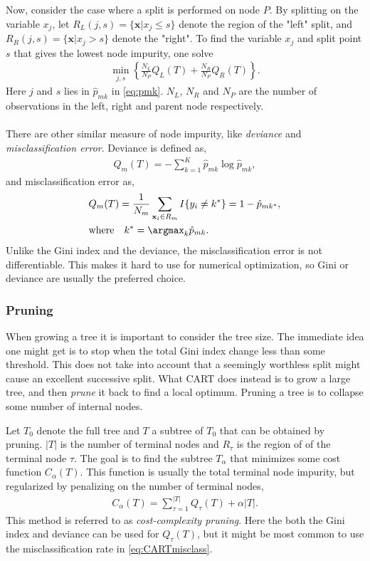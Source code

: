 Now, consider the case where a split is performed on node $P$. By splitting on the variable $x_j$, let $R_L(j,s) = \{\mathbf{x} | x_j \leq s\}$ denote the region of the "left" split,  and $R_R(j,s) = \{\mathbf{x} | x_j > s\}$ denote the "right". To find the variable $x_j$ and split point $s$ that gives the lowest node impurity, one solve
\begin{align}
  \min_{j,s} \left\{ \frac{N_L}{N_P} Q_L(T)
  + \frac{N_R}{N_P} Q_R(T) \right\}.
\end{align}
Here $j$ and $s$ lies in $\hat{p}_{mk}$ in \eqref{eq:pmk}. $N_L$, $N_R$ and $N_P$ are the number of observations in the left, right and parent node respectively.
\\
\\
There are other similar measure of node impurity, like \textit{deviance} and \textit{misclassification error}. Deviance is defined as,
\begin{align}
  Q_m(T) = -  \sum^{K}_{k=1} \hat p_{m k} \log \hat p_{m k},
\end{align}
and misclassification error as,
\begin{align}
  \label{eq:CARTmisclass} 
  &Q_m(T) = \frac{1}{N_m} \sum_{\mathbf{x}_i \in R_m} I\{y_i \neq k^*\} = 1 - \hat p_{m k^*},\\
  &\text{where} \quad k^* = \argmax_k \hat p_{m k}. \notag
\end{align}
Unlike the Gini index and the deviance, the misclassification error is not differentiable. This makes it hard to use for numerical optimization, so Gini or deviance are usually the preferred choice. 

\subsubsection{Pruning}
\label{sub:Pruning}

When growing a tree it is important to consider the tree size. The immediate idea one might get is to stop when the total Gini index change less than some threshold. This does not take into account that a seemingly worthless split might cause an excellent successive split. 
What CART does instead is to grow a large tree, and then \textit{prune} it back to find a local optimum. Pruning a tree is to collapse some number of internal nodes. 

Let $T_0$ denote the full tree and $T$ a subtree of $T_0$ that can be obtained by pruning. $|T|$ is the number of terminal nodes and $R_{\tau}$ is the region of of the terminal node $\tau$. The goal is to find the subtree $T_\alpha$ that minimizes some cost function $C_\alpha (T)$. This function is usually the total terminal node impurity, but regularized by penalizing on the number of terminal nodes,
\begin{align}
  \label{eq:CostPruning} 
  C_\alpha (T) = \sum_{\tau = 1}^{|T|} Q_\tau (T) + \alpha |T|. 
\end{align}
This method is referred to as \textit{cost-complexity pruning}.
Here the both the Gini index and deviance can be used for $Q_\tau (T)$, but it might be most common to use the misclassification rate in \eqref{eq:CARTmisclass}. 

